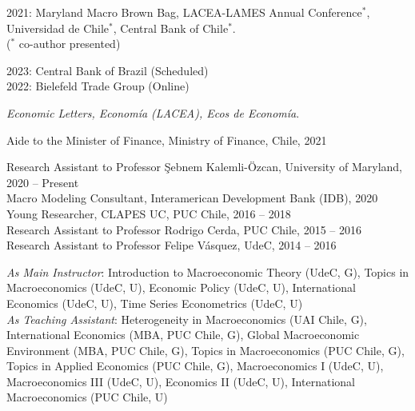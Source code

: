 \documentclass[10pt]{article}
\begin{document}
\begin{description}[leftmargin=10em,style=nextline]
      2021: Maryland Macro Brown Bag, LACEA-LAMES Annual Conference$^\ast$, Universidad de Chile$^\ast$, Central Bank of Chile$^\ast$.\\
      ({\footnotesize $^{*}$ co-author presented})\\[-.1in]
      \item[Invited Seminars] 2023: Central Bank of Brazil (Scheduled)\\
      2022: Bielefeld Trade Group (Online)\\[-.1in]
      \item[Referee]  \emph{Economic Letters, Econom\'ia (LACEA), Ecos de Econom\'ia}.\\[-.1in]
      \item[Relevant] Aide to the Minister of Finance, Ministry of Finance, Chile, 2021\\[-0.22in]
      \item[Experience]  Research Assistant to Professor \c{S}ebnem Kalemli-\"{O}zcan, University of Maryland, 2020 -- Present\\
      Macro Modeling Consultant,  Interamerican Development Bank (IDB), 2020\\
      Young Researcher, CLAPES UC, PUC Chile, 2016 -- 2018\\
      Research Assistant to Professor Rodrigo Cerda, PUC Chile, 2015 -- 2016\\
      Research Assistant to Professor Felipe V\'asquez, UdeC, 2014 -- 2016\\[-.1in]

      \item[Teaching Experience] \textit{As Main Instructor}: Introduction to Macroeconomic Theory (UdeC, G), Topics in Macroeconomics (UdeC, U), Economic Policy (UdeC, U), International Economics (UdeC, U), Time Series Econometrics (UdeC, U)\\
      \textit{As Teaching Assistant}: Heterogeneity in Macroeconomics (UAI Chile, G), International Economics (MBA, PUC Chile, G), Global Macroeconomic Environment (MBA, PUC Chile, G), Topics in Macroeconomics (PUC Chile, G), Topics in Applied Economics (PUC Chile, G), Macroeconomics I (UdeC, U), Macroeconomics III (UdeC, U), Economics II (UdeC, U), International Macroeconomics (PUC Chile, U)\\[-.1in]


\end{description}
\end{document}
